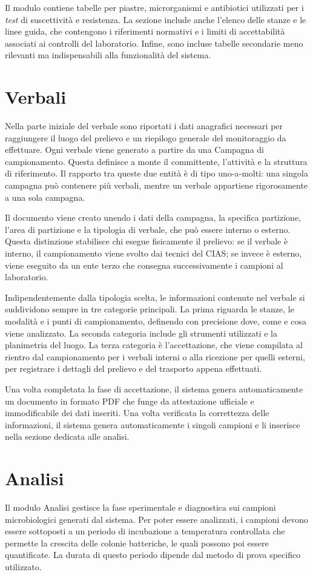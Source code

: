Il modulo contiene tabelle per piastre, microrganismi e antibiotici utilizzati per i \textit{test} di suscettività e resistenza. La sezione include anche l'elenco delle stanze e le linee guida,
che contengono i riferimenti normativi e i limiti di accettabilità associati ai
controlli del laboratorio. Infine, sono incluse tabelle secondarie meno
rilevanti ma indispensabili alla funzionalità del sistema.
\section{Verbali}
Nella parte iniziale del verbale sono riportati i dati anagrafici necessari per raggiungere il luogo del
prelievo e un riepilogo generale del monitoraggio da effettuare. Ogni verbale
viene generato a partire da una Campagna di campionamento. Questa
definisce a monte il committente, l'attività e la struttura di riferimento. Il
rapporto tra queste due entità è di tipo uno-a-molti: una singola campagna può
contenere più verbali, mentre un verbale appartiene rigorosamente a una sola
campagna.

Il documento viene creato unendo i dati della campagna, la specifica
partizione, l'area di partizione e la tipologia di verbale, che può essere
interno o esterno. Questa distinzione stabilisce chi esegue fisicamente il
prelievo: se il verbale è interno, il campionamento viene svolto dai tecnici
del CIAS; se invece è esterno, viene eseguito da un ente terzo che consegna
successivamente i campioni al laboratorio.

Indipendentemente dalla tipologia scelta, le informazioni contenute nel verbale si suddividono sempre
in tre categorie principali. La prima riguarda le stanze, le modalità e i punti
di campionamento, definendo con precisione dove, come e cosa viene analizzato. 
La seconda categoria include gli strumenti utilizzati e la planimetria del luogo. La terza categoria è
l'accettazione, che viene compilata al rientro dal campionamento per i verbali
interni o alla ricezione per quelli esterni, per registrare i dettagli del
prelievo e del trasporto appena effettuati. 

Una volta completata la fase di accettazione, il sistema genera automaticamente un documento in formato PDF che funge da attestazione ufficiale e immodificabile dei dati inseriti. Una
volta verificata la correttezza delle informazioni, il sistema genera automaticamente
i singoli campioni e li inserisce nella sezione dedicata alle analisi.
\section{Analisi}
Il modulo Analisi gestisce la fase sperimentale e diagnostica sui campioni microbiologici generati dal
sistema. Per poter essere analizzati, i campioni devono essere sottoposti a un
periodo di incubazione a temperatura controllata che permette la crescita delle
colonie batteriche, le quali possono poi essere quantificate. La durata di
questo periodo dipende dal metodo di prova specifico utilizzato. 

